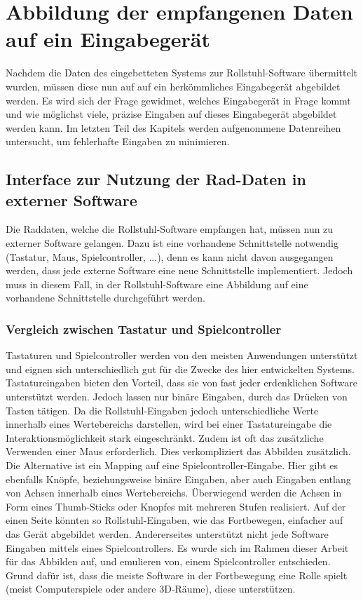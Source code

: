 \chapter{Abbildung der empfangenen Daten auf ein Eingabegerät}
Nachdem die Daten des eingebetteten Systems zur Rollstuhl-Software übermittelt wurden, müssen diese nun auf auf ein herkömmliches Eingabegerät abgebildet werden.
Es wird sich der Frage gewidmet, welches Eingabegerät in Frage kommt und wie möglichst viele, präzise Eingaben auf dieses Eingabegerät abgebildet werden kann.
Im letzten Teil des Kapitels werden aufgenommene Datenreihen untersucht, um fehlerhafte Eingaben zu minimieren.

\section{Interface zur Nutzung der Rad-Daten in externer Software}
Die Raddaten, welche die Rollstuhl-Software empfangen hat, müssen nun zu externer Software gelangen.
Dazu ist eine vorhandene Schnittstelle notwendig (Tastatur, Maus, Spielcontroller, ...), denn es kann nicht davon ausgegangen werden, dass jede externe Software eine neue Schnittstelle implementiert.
Jedoch muss in diesem Fall, in der Rollstuhl-Software eine Abbildung auf eine vorhandene Schnittstelle durchgeführt werden.

\subsection{Vergleich zwischen Tastatur und Spielcontroller}
Tastaturen und Spielcontroller werden von den meisten Anwendungen unterstützt und eignen sich unterschiedlich gut für die Zwecke des hier entwickelten Systems.
Tastatureingaben bieten den Vorteil, dass sie von fast jeder erdenklichen Software unterstützt werden. Jedoch lassen nur binäre Eingaben, durch das Drücken von Tasten tätigen.
Da die Rollstuhl-Eingaben jedoch unterschiedliche Werte innerhalb eines Wertebereichs darstellen, wird bei einer Tastatureingabe die Interaktionsmöglichkeit stark eingeschränkt.
Zudem ist oft das zusätzliche Verwenden einer Maus erforderlich. Dies verkompliziert das Abbilden zusätzlich.
Die Alternative ist ein Mapping auf eine Spielcontroller-Eingabe.
Hier gibt es ebenfalls Knöpfe, beziehungsweise binäre Eingaben, aber auch Eingaben entlang von Achsen innerhalb eines Wertebereichs.
Überwiegend werden die Achsen in Form eines Thumb-Sticks oder Knopfes mit mehreren Stufen realisiert.
Auf der einen Seite könnten so Rollstuhl-Eingaben, wie das Fortbewegen, einfacher auf das Gerät abgebildet werden.
Andererseites unterstützt nicht jede Software Eingaben mittels eines Spielcontrollers.
Es wurde sich im Rahmen dieser Arbeit für das Abbilden auf, und emulieren von, einem Spielcontroller entschieden.
Grund dafür ist, dass die meiste Software in der Fortbewegung eine Rolle spielt (meist Computerspiele oder andere 3D-Räume), diese unterstützen.

